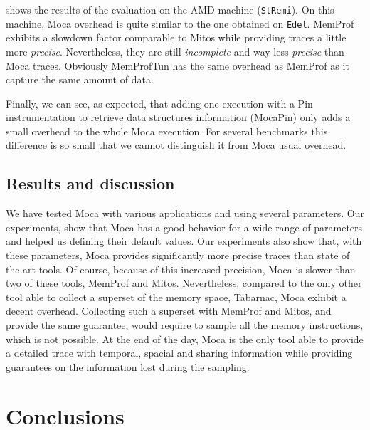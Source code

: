  shows the results of the evaluation on the AMD machine
(\texttt{StRemi}). On this machine, \gls{Moca} overhead is quite similar to the one
obtained on \texttt{Edel}.
\gls{MemProf} exhibits a slowdown factor comparable to \gls{Mitos} while
providing traces a little more \emph{precise}. Nevertheless, they are still \emph{incomplete} and
way less \emph{precise} than \gls{Moca} traces. Obviously MemProfTun has the same
overhead as \gls{MemProf} as it capture the same amount of data.

Finally, we can see, as expected, that adding one execution with a Pin instrumentation to retrieve data structures information (MocaPin) only adds a small overhead to the whole \gls{Moca} execution.
For several benchmarks this difference is so small that we cannot distinguish it from \gls{Moca} usual overhead.

\subsection{Results and discussion}

We have tested \gls{Moca} with various applications and using several parameters.
Our experiments, show that \gls{Moca} has a good behavior for a wide range of parameters and helped us defining their default values.
Our experiments also show that, with these parameters, \gls{Moca} provides significantly more precise traces than state of the art tools.
Of course, because of this increased precision, \gls{Moca} is slower than two of these tools, \gls{MemProf} and \gls{Mitos}.
Nevertheless, compared to the only other tool able to collect a superset of the memory space, \gls{Tabarnac}, \gls{Moca} exhibit a decent overhead.
Collecting such a superset with \gls{MemProf} and \gls{Mitos}, and provide the same guarantee, would require to sample all the memory instructions, which is not possible.
At the end of the day, \gls{Moca} is the only tool able to provide a detailed trace with temporal, spacial and sharing information while providing guarantees on the information lost during the sampling.


\section{Conclusions}
\label{sec:tracing-cncl}

